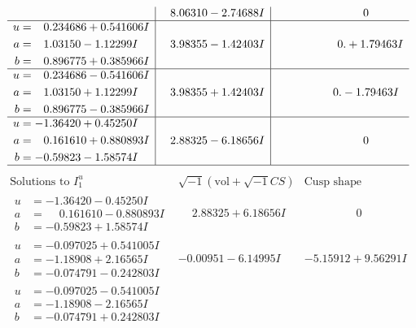 \documentclass[1p]{elsarticle_modified}
\theoremstyle{definition}
\newcommand{\I}{\sqrt{-1}}
\begin{document}
$$\begin{array}{c|c|c}
 & \phantom{-}8.06310 - 2.74688 I & \phantom{-0.000000 } 0 \\ \hline\begin{aligned}
u &= \phantom{-}0.234686 + 0.541606 I \\
a &= \phantom{-}1.03150 - 1.12299 I \\
b &= \phantom{-}0.896775 + 0.385966 I\end{aligned}
 & \phantom{-}3.98355 - 1.42403 I & \phantom{-0.000000 -}0. + 1.79463 I \\ \hline\begin{aligned}
u &= \phantom{-}0.234686 - 0.541606 I \\
a &= \phantom{-}1.03150 + 1.12299 I \\
b &= \phantom{-}0.896775 - 0.385966 I\end{aligned}
 & \phantom{-}3.98355 + 1.42403 I & \phantom{-0.000000 } 0. - 1.79463 I \\ \hline\begin{aligned}
u &= -1.36420 + 0.45250 I \\
a &= \phantom{-}0.161610 + 0.880893 I \\
b &= -0.59823 - 1.58574 I\end{aligned}
 & \phantom{-}2.88325 - 6.18656 I & \phantom{-0.000000 } 0\\
 \hline 
 \end{array}$$\newpage$$\begin{array}{c|c|c}  
\text{Solutions to }I^u_{1}& \I (\text{vol} + \sqrt{-1}CS) & \text{Cusp shape}\\
 \hline 
\begin{aligned}
u &= -1.36420 - 0.45250 I \\
a &= \phantom{-}0.161610 - 0.880893 I \\
b &= -0.59823 + 1.58574 I\end{aligned}
 & \phantom{-}2.88325 + 6.18656 I & \phantom{-0.000000 } 0 \\ \hline\begin{aligned}
u &= -0.097025 + 0.541005 I \\
a &= -1.18908 + 2.16565 I \\
b &= -0.074791 - 0.242803 I\end{aligned}
 & -0.00951 - 6.14995 I & -5.15912 + 9.56291 I \\ \hline\begin{aligned}
u &= -0.097025 - 0.541005 I \\
a &= -1.18908 - 2.16565 I \\
b &= -0.074791 + 0.242803 I\end{aligned}

\end{array}$$
\end{document}
